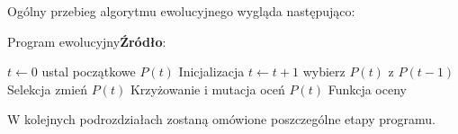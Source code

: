 Ogólny przebieg algorytmu ewolucyjnego wygląda następująco:

\begin{algorithm}
	\caption{Program ewolucyjny\hfill\textbf{Źródło}: \cite{genetyczne} }\label{ewolucyjny}
	\begin{algorithmic}[1]
		\State $t\gets 0$
		\State ustal początkowe $P(t)$ 	\Comment Inicjalizacja
			\State $t\gets t + 1$
			\State wybierz $P(t)$ z $P(t - 1)$ \Comment Selekcja
			\State zmień $P(t)$ \Comment Krzyżowanie i mutacja
			\State oceń $P(t)$ \Comment Funkcja oceny
		\EndWhile
		\EndProcedure
	\end{algorithmic}
\end{algorithm}

W kolejnych podrozdziałach zostaną omówione poszczególne etapy programu.